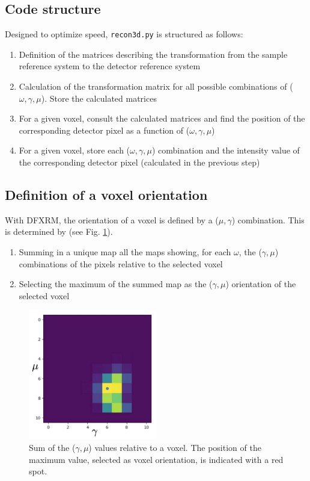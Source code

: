 \documentclass[11pt]{scrartcl}
\begin{document}
\subsection{Code structure}

Designed to optimize speed, {\texttt{recon3d.py}} is structured as follows:
\begin{enumerate}
    \item Definition of the matrices describing the transformation from the sample reference system to the detector reference system
    \item Calculation of the transformation matrix for all possible combinations of ($\omega, \gamma, \mu$). Store the calculated matrices
    \item For a given voxel, consult the calculated matrices and find the position of the corresponding detector pixel as a function of ($\omega, \gamma, \mu$)
    \item For a given voxel, store each ($\omega, \gamma, \mu$) combination and the intensity value of the corresponding detector pixel (calculated in the previous step)
\end{enumerate}

\subsection{Definition of a voxel orientation}

With {\footnotesize{DFXRM}}, the orientation of a voxel is defined by a ($\mu, \gamma$) combination. This is determined by (see Fig. \ref{fig:mosaicity_map}).
\begin{enumerate}
    \item Summing in a unique map all the maps showing, for each $\omega$, the ($\gamma, \mu$) combinations of the pixels relative to the selected voxel
    \item Selecting the maximum of the summed map as the ($\gamma, \mu$) orientation of the selected voxel
\end{enumerate}

\begin{figure}[h]
    \centering
    \includegraphics[width=0.5\textwidth]{Mosaicity_map.png}
    \caption{Sum of the ($\gamma, \mu$) values relative to a voxel. The position of the maximum value, selected as voxel orientation, is indicated with a red spot.}
    \label{fig:mosaicity_map}
\end{figure}
\end{document}
